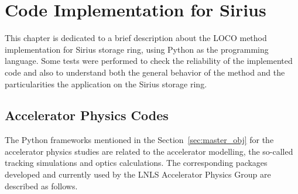 \chapter{Code Implementation for Sirius}
This chapter is dedicated to a brief description about the LOCO method implementation for Sirius storage ring, using Python as the programming language. Some tests were performed to check the reliability of the implemented code and also to understand both the general behavior of the method and the particularities the application on the Sirius storage ring.
\section{Accelerator Physics Codes}
The Python frameworks mentioned in the Section~\ref{sec:master_obj} for the accelerator physics studies are related to the accelerator modelling, the so-called tracking simulations and optics calculations. The corresponding packages developed and currently used by the LNLS Accelerator Physics Group are described as follows.

